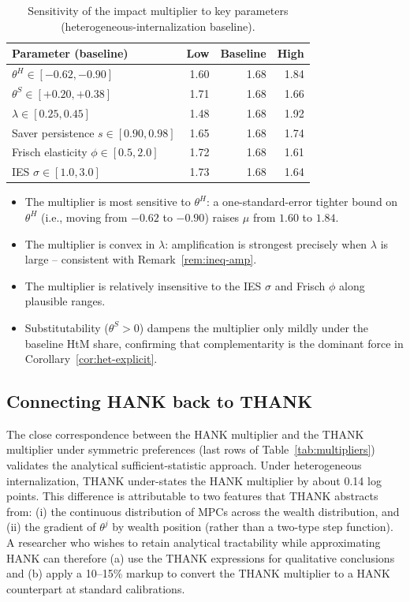 \begin{table}[ht]
\centering\small
\caption{Sensitivity of the impact multiplier to key parameters
(heterogeneous-internalization baseline).}
\label{tab:sensitivity}
\begin{tabular}{@{}lrrr@{}}
\toprule
Parameter (baseline) & Low & Baseline & High \\
\midrule
$\theta^{H}\in[-0.62,-0.90]$             & 1.60 & 1.68 & 1.84 \\
$\theta^{S}\in[+0.20,+0.38]$             & 1.71 & 1.68 & 1.66 \\
$\lambda \in [0.25, 0.45]$               & 1.48 & 1.68 & 1.92 \\
Saver persistence $s \in [0.90, 0.98]$   & 1.65 & 1.68 & 1.74 \\
Frisch elasticity $\phi \in [0.5, 2.0]$  & 1.72 & 1.68 & 1.61 \\
IES $\sigma \in [1.0, 3.0]$              & 1.73 & 1.68 & 1.64 \\
\bottomrule
\end{tabular}
\end{table}

\begin{itemize}[leftmargin=1.4em]
  \item The multiplier is most sensitive to $\theta^{H}$: a one-standard-error
    tighter bound on $\theta^{H}$ (i.e., moving from $-0.62$ to $-0.90$) raises
    $\mu$ from $1.60$ to $1.84$.
  \item The multiplier is convex in $\lambda$: amplification is strongest
    precisely when $\lambda$ is large -- consistent with
    Remark~\ref{rem:ineq-amp}.
  \item The multiplier is relatively insensitive to the IES $\sigma$ and
    Frisch $\phi$ along plausible ranges.
  \item Substitutability ($\theta^{S}>0$) dampens the multiplier only mildly
    under the baseline HtM share, confirming that \HtM{} complementarity is the
    dominant force in Corollary~\ref{cor:het-explicit}.
\end{itemize}

\subsection{Connecting HANK back to THANK}
\label{subsec:hank-vs-thank}

The close correspondence between the HANK multiplier and the THANK multiplier
under symmetric preferences (last rows of Table~\ref{tab:multipliers}) validates
the analytical sufficient-statistic approach. Under heterogeneous
internalization, THANK under-states the HANK multiplier by about 0.14 log
points. This difference is attributable to two features that THANK abstracts
from: (i) the continuous distribution of MPCs across the wealth distribution,
and (ii) the gradient of $\theta^{j}$ by wealth position (rather than a
two-type step function). A researcher who wishes to retain analytical
tractability while approximating HANK can therefore (a) use the THANK
expressions for qualitative conclusions and (b) apply a 10--15\% markup to
convert the THANK multiplier to a HANK counterpart at standard calibrations.
